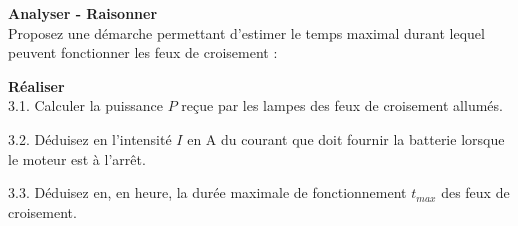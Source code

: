 \documentclass[11pt,a4paper]{article}
\newcommand{\cadreblanc}[1]{%
\medskip\framebox[\linewidth][c]{%
\rule{0mm}{#1mm}}\par
\medskip}
\begin{document}
\textbf{ Analyser - Raisonner} \\

Proposez une démarche permettant d'estimer le temps maximal durant lequel peuvent fonctionner les feux de croisement : \\

\cadreblanc{20}

\textbf{ Réaliser} \\
3.1. Calculer la puissance $P$ reçue par les lampes des feux de croisement allumés. \\

\cadreblanc{15}

3.2. Déduisez en  l'intensité $I$ en A du courant que doit fournir la batterie lorsque le moteur est à l'arrêt. \\

\cadreblanc{8}

3.3. Déduisez en, en heure, la durée maximale de fonctionnement $t_{max}$ des feux de croisement. \\

\cadreblanc{8}
\end{document}
